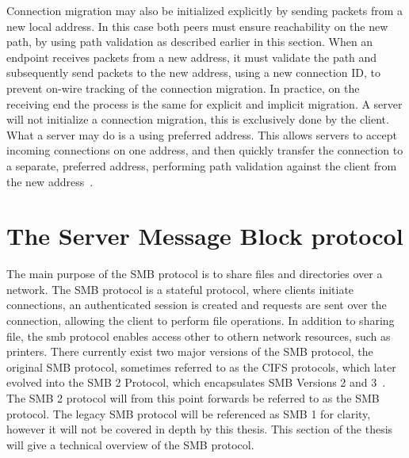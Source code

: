 \documentclass[english, 12pt, a4paper, elec, utf8, a-2b, online]{aaltothesis}
\begin{document}
Connection migration may also be initialized explicitly by sending packets from
a new local address. In this case both peers must ensure reachability on the
new path, by using path validation as described earlier in this section. When an endpoint
receives packets from a new address, it must validate the path and subsequently
send packets to the new address, using a new connection ID, to prevent on-wire
tracking of the connection migration. In practice, on the receiving end the process
is the same for explicit and implicit migration. A server will not initialize a 
connection migration, this is exclusively done by the client. What a server may
do is a using preferred address. This allows servers to accept incoming connections
on one address, and then quickly transfer the connection to a separate, preferred
address, performing path validation against the client from the new address~\cite{rfc9000}.

\clearpage

\section{The Server Message Block protocol}
\label{sec:smb}

The main purpose of the SMB protocol is to share files and directories over a network.
The SMB protocol is a stateful protocol, where clients initiate connections,
an authenticated session is created and requests are sent over the connection, allowing
the client to perform file operations. In addition to sharing file, the smb protocol enables
access other to othern network resources, such as printers. There currently exist
two major versions of the SMB protocol, the original SMB protocol, sometimes referred to as the CIFS protocols, which later
evolved into the SMB 2 Protocol, which encapsulates SMB Versions 2 and 3~\cite{smb2_tech}. The SMB 2
protocol will from this point forwards be referred to as the SMB protocol.
The legacy SMB protocol will be referenced as SMB 1 for clarity, however it will
not be covered in depth by this thesis. This section of the thesis will give a
technical overview of the SMB protocol.
\end{document}
